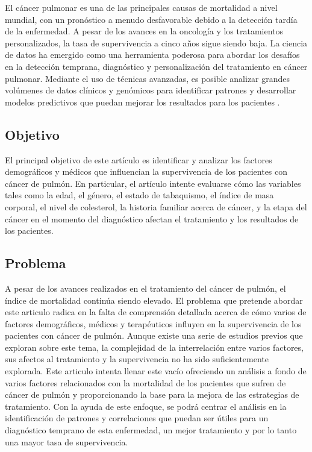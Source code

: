\documentclass[10pt,journal,compsoc]{IEEEtran}
\begin{document}
 El cáncer pulmonar es una de las principales causas de mortalidad a nivel mundial, con un pronóstico a menudo desfavorable debido a la detección tardía de la enfermedad. A pesar de los avances en la oncología y los tratamientos personalizados, la tasa de supervivencia a cinco años sigue siendo baja. La ciencia de datos ha emergido como una herramienta poderosa para abordar los desafíos en la detección temprana, diagnóstico y personalización del tratamiento en cáncer pulmonar. Mediante el uso de técnicas avanzadas, es posible analizar grandes volúmenes de datos clínicos y genómicos para identificar patrones y desarrollar modelos predictivos que puedan mejorar los resultados para los pacientes .

\subsection{Objetivo}
El principal objetivo de este artículo es identificar y analizar los factores demográficos y médicos que influencian la supervivencia de los pacientes con cáncer de pulmón. En particular, el artículo intente evaluarse cómo las variables tales como la edad, el género, el estado de tabaquismo, el índice de masa corporal, el nivel de colesterol, la historia familiar acerca de cáncer, y la etapa del cáncer en el momento del diagnóstico afectan el tratamiento y los resultados de los pacientes.

\subsection{Problema}
A pesar de los avances realizados en el tratamiento  del cáncer de pulmón, el índice de mortalidad continúa siendo elevado. El problema que pretende abordar este articulo radica en la falta de comprensión detallada acerca de cómo varios de factores demográficos, médicos y terapéuticos influyen en la supervivencia de los pacientes con cáncer de pulmón. Aunque existe una serie de estudios previos que exploran sobre este tema, la complejidad de la interrelación entre varios factores, sus afectos al tratamiento y la supervivencia no ha sido suficientemente explorada. Este articulo intenta llenar este vacío ofreciendo un análisis a fondo de varios factores relacionados con la mortalidad de los pacientes que sufren de cáncer de pulmón y proporcionando la base para la mejora de las estrategias de tratamiento. Con la ayuda de este enfoque, se podrá centrar el análisis en la identificación de patrones y correlaciones que puedan ser útiles para un diagnóstico temprano de esta enfermedad, un mejor tratamiento y por lo tanto una mayor tasa de supervivencia.
\end{document}
